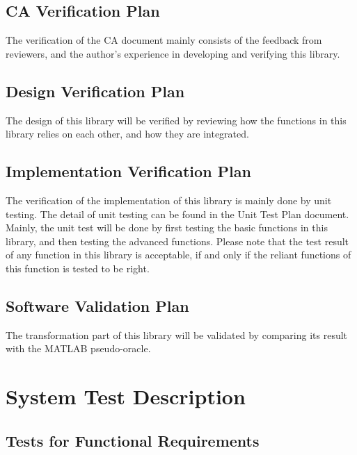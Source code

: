 \documentclass[12pt, titlepage]{article}
\begin{document}
\subsection{CA Verification Plan}

The verification of the CA document mainly consists of the feedback from reviewers, and the author's experience in developing and verifying this library. 


\subsection{Design Verification Plan}

The design of this library will be verified by reviewing how the functions in this library relies on each other, and how they are integrated.

\subsection{Implementation Verification Plan}

The verification of the implementation of this library is mainly done by unit testing. The detail of unit testing can be found in the Unit Test Plan document. Mainly, the unit test will be done by first testing the basic functions in this library, and then testing the advanced functions. Please note that the test result of any function in this library is acceptable, if and only if the reliant functions of this function is tested to be right.
  


\subsection{Software Validation Plan}

The transformation part of this library will be validated by comparing its result with the MATLAB pseudo-oracle.

\section{System Test Description}
	
\subsection{Tests for Functional Requirements}

\end{document}

